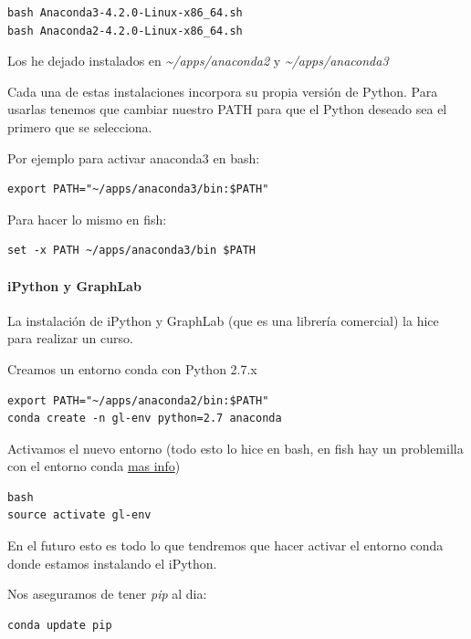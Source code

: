 \documentclass[12pt,spanish,]{scrartcl}
\let\oldparagraph\paragraph
\renewcommand{\paragraph}[1]{\oldparagraph{#1}\mbox{}}
\begin{document}
\begin{verbatim}
bash Anaconda3-4.2.0-Linux-x86_64.sh
bash Anaconda2-4.2.0-Linux-x86_64.sh
\end{verbatim}

Los he dejado instalados en \emph{\textasciitilde{}/apps/anaconda2} y
\emph{\textasciitilde{}/apps/anaconda3}

Cada una de estas instalaciones incorpora su propia versión de Python.
Para usarlas tenemos que cambiar nuestro PATH para que el Python deseado
sea el primero que se selecciona.

Por ejemplo para activar anaconda3 en bash:

\begin{verbatim}
export PATH="~/apps/anaconda3/bin:$PATH"
\end{verbatim}

Para hacer lo mismo en fish:

\begin{verbatim}
set -x PATH ~/apps/anaconda3/bin $PATH
\end{verbatim}

\hypertarget{ipython-y-graphlab}{%
\paragraph{iPython y GraphLab}\label{ipython-y-graphlab}}

La instalación de iPython y GraphLab (que es una librería comercial) la
hice para realizar un curso.

Creamos un entorno conda con Python 2.7.x

\begin{verbatim}
export PATH="~/apps/anaconda2/bin:$PATH"
conda create -n gl-env python=2.7 anaconda
\end{verbatim}

Activamos el nuevo entorno (todo esto lo hice en bash, en fish hay un
problemilla con el entorno conda
\href{https://penandpants.com/2014/02/28/using-conda-environments-and-the-fish-shell/}{mas
info})

\begin{verbatim}
bash
source activate gl-env
\end{verbatim}

En el futuro esto es todo lo que tendremos que hacer activar el entorno
conda donde estamos instalando el iPython.

Nos aseguramos de tener \emph{pip} al dia:

\begin{verbatim}
conda update pip
\end{verbatim}
\end{document}
